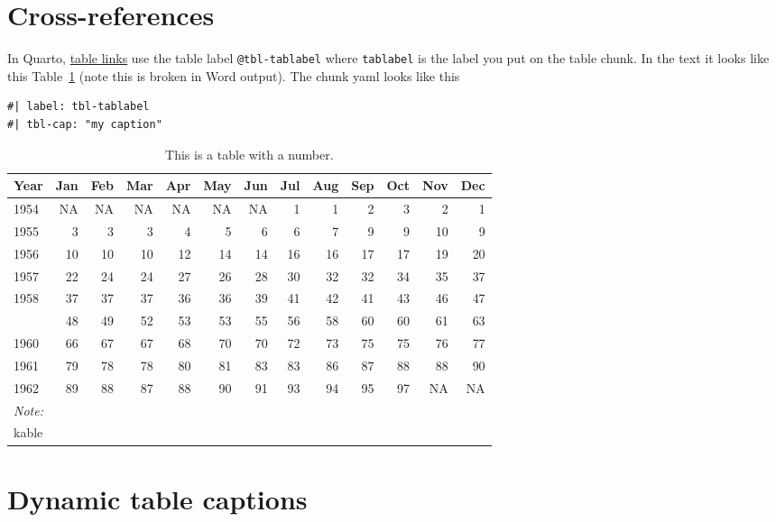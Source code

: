 \documentclass[
  letterpaper,
  oneside]{scrbook}
\begin{document}
\hypertarget{cross-references-1}{%
\section{Cross-references}\label{cross-references-1}}

In Quarto,
\href{https://quarto.org/docs/authoring/cross-references.html\#tables}{table
links} use the table label \texttt{@tbl-tablabel} where
\texttt{tablabel} is the label you put on the table chunk. In the text
it looks like this Table~\ref{tbl-tablabel} (note this is broken in Word
output). The chunk yaml looks like this

\begin{verbatim}
#| label: tbl-tablabel
#| tbl-cap: "my caption"
\end{verbatim}

\hypertarget{tbl-tablabel}{}
\begin{table}
\caption{\label{tbl-tablabel}This is a table with a number. }\tabularnewline

\centering
\begin{tabular}[t]{lrrrrrrrrrrrr}
\toprule
Year & Jan & Feb & Mar & Apr & May & Jun & Jul & Aug & Sep & Oct & Nov & Dec\\
\midrule
1954 & NA & NA & NA & NA & NA & NA & 1 & 1 & 2 & 3 & 2 & 1\\
1955 & 3 & 3 & 3 & 4 & 5 & 6 & 6 & 7 & 9 & 9 & 10 & 9\\
1956 & 10 & 10 & 10 & 12 & 14 & 14 & 16 & 16 & 17 & 17 & 19 & 20\\
1957 & 22 & 24 & 24 & 27 & 26 & 28 & 30 & 32 & 32 & 34 & 35 & 37\\
1958 & 37 & 37 & 37 & 36 & 36 & 39 & 41 & 42 & 41 & 43 & 46 & 47\\
\addlinespace
1959 & 48 & 49 & 52 & 53 & 53 & 55 & 56 & 58 & 60 & 60 & 61 & 63\\
1960 & 66 & 67 & 67 & 68 & 70 & 70 & 72 & 73 & 75 & 75 & 76 & 77\\
1961 & 79 & 78 & 78 & 80 & 81 & 83 & 83 & 86 & 87 & 88 & 88 & 90\\
1962 & 89 & 88 & 87 & 88 & 90 & 91 & 93 & 94 & 95 & 97 & NA & NA\\
\bottomrule
\multicolumn{13}{l}{\rule{0pt}{1em}\textit{Note: }}\\
\multicolumn{13}{l}{\rule{0pt}{1em}kable}\\
\end{tabular}
\end{table}

\hypertarget{dynamic-table-captions}{%
\section{Dynamic table captions}\label{dynamic-table-captions}}
\end{document}
